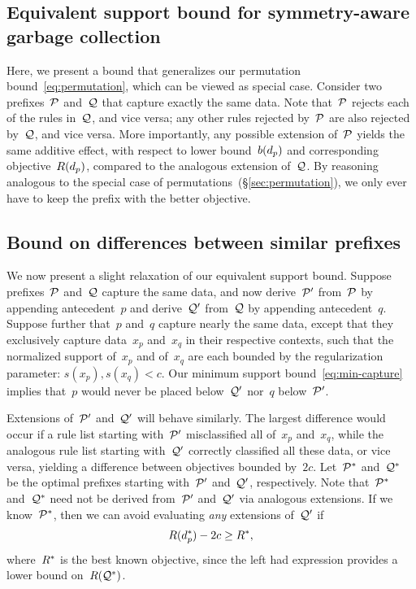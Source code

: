 \subsection{Equivalent support bound for symmetry-aware garbage collection}

Here, we present a bound that generalizes our permutation bound~\eqref{eq:permutation},
which can be viewed as special case.
%
Consider two prefixes~$\cal P$ and~$\cal Q$ that capture exactly the same data.
%
Note that~$\cal P$ rejects each of the rules in~$\cal Q$, and vice versa;
any other rules rejected by~$\cal P$ are also rejected by~$\cal Q$, and vice versa.
%
More importantly, any possible extension of~$\cal P$ yields the same additive effect,
with respect to lower bound~$b(d_p)$ and corresponding objective~$R(d_p)$,
compared to the analogous extension of~$\cal Q$.
%
By reasoning analogous to the special case of permutations~(\S\ref{sec:permutation}),
we only ever have to keep the prefix with the better objective.

\subsection{Bound on differences between similar prefixes}

We now present a slight relaxation of our equivalent support bound.
%
Suppose prefixes~$\cal P$ and~$\cal Q$ capture the same data,
and now derive~$\cal P'$ from~$\cal P$ by appending antecedent~$p$
and derive~$\cal Q'$ from~$\cal Q$ by appending antecedent~$q$.
%
Suppose further that~$p$ and~$q$ capture nearly the same data, except that
they exclusively capture data~$x_p$ and~$x_q$ in their respective contexts,
such that the normalized support of~$x_p$ and of~$x_q$ are each bounded by
the regularization parameter: ${s(x_p), s(x_q) < c}$.
%
Our minimum support bound~\eqref{eq:min-capture} implies
that~$p$ would never be placed below~$\cal Q'$ nor~$q$ below~$\cal P'$.

Extensions of~$\cal P'$ and~$\cal Q'$ will behave similarly.
%
The largest difference would occur if a rule list starting with~$\cal P'$
misclassified all of~$x_p$ and~$x_q$, while the analogous rule list starting
with~$\cal Q'$ correctly classified all these data, or vice versa,
yielding a difference between objectives bounded by~$2c$.
%
Let~$\cal P^*$ and~$\cal Q^*$ be the optimal prefixes
starting with~$\cal P'$ and~$\cal Q'$, respectively.
%
Note that~$\cal P^*$ and~$\cal Q^*$ need not be derived from~$\cal P'$ and~$\cal Q'$
via analogous extensions.
%
If we know~$\cal P^*$, then we can avoid evaluating \emph{any} extensions of~$\cal Q'$ if
\begin{align}
\Obj(\Prefix^*) - 2 c \ge \Obj^*,
\end{align}
where~$R^*$ is the best known objective, since the left had expression
provides a lower bound on~$R(\cal{Q}^*)$.

